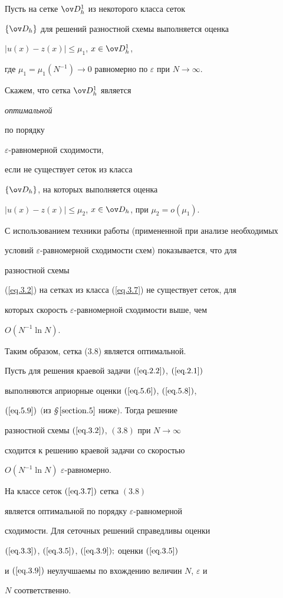 \begin{defns}


Пусть на сетке $\ov D^1_h$ из некоторого класса сеток


$\{\ov D_h\}$ для решений разностной схемы выполняется оценка


$|u(x)-z(x)|\le \mu_1$, $x\in \ov D^1_h$,


где $\mu_1=\mu_1(N^{-1})\to 0$ равномерно по $\varepsilon$ при $N\to \infty$.


Скажем, что сетка $\ov D^1_h$ является {\it оптимальной


по порядку} $\varepsilon$-равномерной сходимости,


если не существует сеток из класса


$\{\ov D_h\}$, на которых выполняется оценка


$|u(x)-z(x)|\le \mu_2$, $x\in \ov D_h$, при $\mu_2=o(\mu_1)$.


\end{defns}





С использованием техники работы \cite{6} (примененной при анализе необходимых


условий $\varepsilon$-равномерной сходимости схем) показывается, что для


разностной схемы


(\ref{eq.3.2}) на сетках из класса (\ref{eq.3.7}) не существует сеток, для


которых скорость $\varepsilon$-равномерной сходимости выше, чем


$O(N^{-1}\ln N)$.


Таким образом, сетка (3.8) является оптимальной.





\begin{thms} \label{t3.1}


Пусть для решения краевой задачи $(\ref{eq.2.2})$, $(\ref{eq.2.1})$


выполняются априорные оценки $(\ref{eq.5.6})$, $(\ref{eq.5.8})$,


$(\ref{eq.5.9})$ $($из {\em \S}\,$\ref{section.5}$ ниже$)$. Тогда решение


разностной схемы $(\ref{eq.3.2})$, $(3.8)$  при $N\to\infty$


сходится к решению краевой задачи со скоростью


$O(N^{-1}\ln N)$\; $\varepsilon$-равномерно. 


На классе сеток $(\ref{eq.3.7})$ сетка $(3.8)$ 


является оптимальной по порядку $\varepsilon$-равномерной


сходимости. Для сеточных решений справедливы оценки


$(\ref{eq.3.3})$, $(\ref{eq.3.5})$, $(\ref{eq.3.9});$ оценки $(\ref{eq.3.5})$


и $(\ref{eq.3.9})$ неулучшаемы по вхождению величин $N$, $\varepsilon$ и


$N$ соответственно.


\end{thms}





